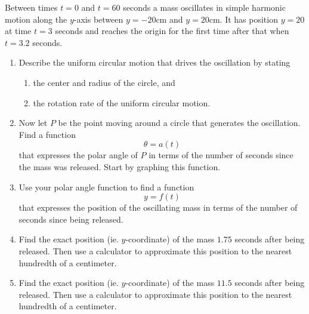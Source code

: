 \documentclass{ximera}
\begin{document}
\begin{example} \label{ExLKDF3rerdf}
Between times $t=0$ and $t=60$ seconds a mass oscillates in simple harmonic motion along the $y$-axis between $y=-20$cm and $y=20$cm. It has position $y=20$ at time $t=3$ seconds and reaches the origin for the first time after that when $t=3.2$ seconds. 

\begin{enumerate}

\item Describe the uniform circular motion that drives the oscillation by stating
\begin{enumerate}
\item the center and radius of the circle, and

\item the rotation rate of the uniform circular motion. 
\end{enumerate}


\item Now let $P$ be the point moving around a circle that generates the oscillation. Find a function
\[
    \theta = a(t)
\]
that expresses the polar angle of $P$ in terms of the number of seconds since the mass was released. Start by graphing this function. 

\item Use your polar angle function to find a function 
\[
   y= f(t)
\]
that expresses the position of the oscillating mass in terms of the number of seconds since being released.


\item Find the exact position (ie. $y$-coordinate) of the mass $1.75$ seconds after being released. Then use a calculator to approximate this position to the nearest hundredth of a centimeter.


\item Find the exact position (ie. $y$-coordinate) of the mass $11.5$ seconds after being released. Then use a calculator to approximate this position to the nearest hundredth of a centimeter.

\end{enumerate}
\end{example}
\end{document}
